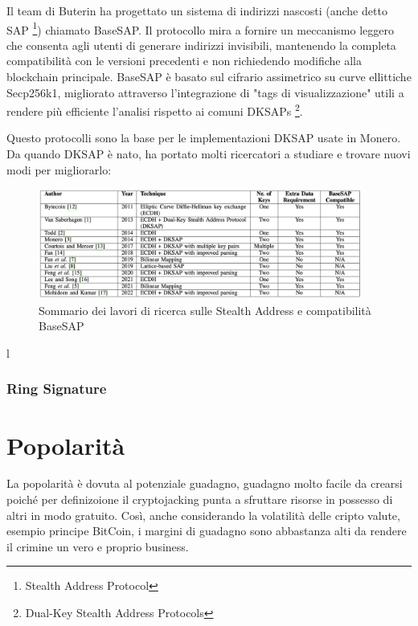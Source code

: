 \documentclass[12pt,a4paper]{article}
\begin{document}
    Il team di Buterin ha progettato un sistema di indirizzi nascosti (anche
    detto SAP \footnote{Stealth Address Protocol}) chiamato BaseSAP. Il
    protocollo mira a fornire un meccanismo leggero che consenta agli utenti di
    generare indirizzi invisibili, mantenendo la completa compatibilità con le
    versioni precedenti e non richiedendo modifiche alla blockchain principale.
    BaseSAP è basato sul cifrario assimetrico su curve ellittiche Secp256k1,
    migliorato attraverso l'integrazione di "tags di visualizzazione" utili a
    rendere più efficiente l'analisi rispetto ai comuni DKSAPs
    \footnote{Dual-Key Stealth Address Protocols}.

    Questo protocolli sono la base per le implementazioni DKSAP usate in Monero.
    Da quando DKSAP è nato, ha portato molti ricercatori a studiare e trovare
    nuovi modi per migliorarlo:

    \begin{figure}[ht]
        \centering
        \includegraphics[width=0.95\textwidth]{./images/sommario.png}
        \caption{Sommario dei lavori di ricerca sulle Stealth Address e compatibilità BaseSAP}
        \label{fig:summary}
    \end{figure}l

\subsubsection{Ring Signature}

\newpage 

\section{Popolarità}
La popolarità è dovuta al potenziale guadagno, guadagno molto facile da crearsi
poiché per definizoione il cryptojacking punta a sfruttare risorse in possesso
di altri in modo gratuito. Così, anche considerando la volatilità delle cripto
valute, esempio principe BitCoin, i margini di guadagno sono abbastanza alti da
rendere il crimine un vero e proprio business. 
\end{document}
